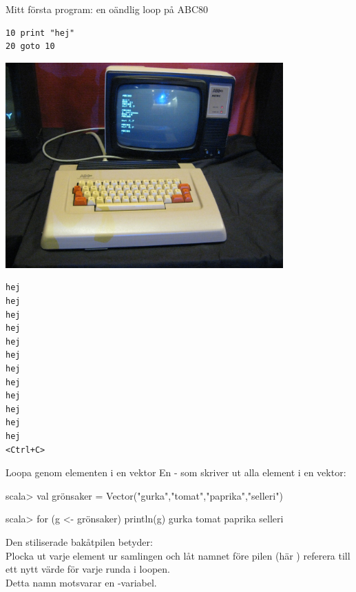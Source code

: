 \ifkompendium\else
\begin{SlideExtra}{Mitt första program: en oändlig loop på ABC80}
\begin{minipage}{0.8\textwidth}
\begin{verbatim}
10 print "hej"
20 goto 10
\end{verbatim}
\includegraphics[width=0.8\textwidth]{../img/abc80.jpg}
\end{minipage}%
\begin{minipage}{0.2\textwidth}
\pause
\begin{verbatim}
hej
hej
hej
hej
hej
hej
hej
hej
hej
hej
hej
hej
<Ctrl+C>
\end{verbatim}
\end{minipage}
\end{SlideExtra}
\fi

\begin{Slide}{Loopa genom elementen i en vektor}
En - som skriver ut alla element i en vektor:
\begin{REPL}
scala> val grönsaker = Vector("gurka","tomat","paprika","selleri")

scala> for (g <- grönsaker) println(g)
gurka
tomat
paprika
selleri

\end{REPL}
Den stiliserade bakåtpilen \code{<-} betyder:\\Plocka ut varje element ur samlingen och låt namnet före pilen (här ) referera till ett nytt värde för varje runda i loopen.\\Detta namn motsvarar en  -variabel.
\end{Slide}



